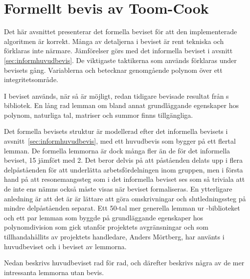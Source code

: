 \section{Formellt bevis av Toom-Cook}
\label{sec:formellbevis}
Det här avsnittet presenterar det formella beviset för att den implementerade
algoritmen är korrekt. Många av detaljerna i beviset är rent tekniska och
förklaras inte närmare. Jämförelser görs med det informella beviset i avsnitt
\ref{sec:informhuvudbevis}. De viktigaste taktikerna som används förklaras under
bevisets gång. Variablerna  och  betecknar genomgående polynom över
ett integritetsområde.

I beviset används, när så är möjligt, redan tidigare bevisade resultat från
\ssr{}s bibliotek. En lång rad lemman om bland annat grundläggande egenskaper
hos polynom, naturliga tal, matriser och summor finns tillgängliga.

Det formella bevisets struktur är modellerad efter det informella bevisets i
avsnitt~\ref{sec:informhuvudbevis}, med ett huvudbevis som bygger på ett
flertal lemman. De formella lemmorna är dock många fler än de för det
informella beviset, 15 jämfört med 2. Det beror delvis på att påståenden delats
upp i flera delpåståenden för att underlätta arbetsfördelningen inom gruppen,
men i första hand på att resonemangssteg som i det informella beviset ses som
så triviala att de inte ens nämns också måste visas när beviset formaliseras.
En ytterligare anledning är att det är är lättare att göra omskrivningar och
slutledningssteg på mindre delpåståenden separat. Ett 50-tal mer generella
lemman ur \ssr{}-biblioteket och ett par lemman som byggde på grundläggande
egenskaper hos polynomdivision som gick utanför projektets avgränsningar och
som tillhandahållits av projektets handledare, Anders Mörtberg, har använts i
huvudbeviset och i beviset av lemmorna.

Nedan beskrivs huvudbeviset rad för rad, och därefter beskrivs några av de mer
intressanta lemmorna utan bevis.

